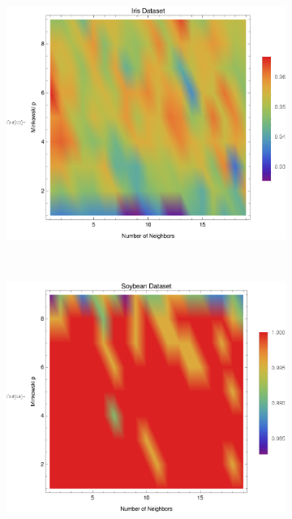 \documentclass{article}
\begin{document}
\begin{figure}[h!]
\begin{subfigure}[b]{0.32\textwidth}
					\caption{}
					\label{kp_glass}					
				\end{subfigure} \	
				\begin{subfigure}[b]{0.32\textwidth}
					\centering
					\includegraphics[width=\textwidth]{figs/kNN/iris_plot_kp}	
					\caption{}
					\label{kp_iris}				
				\end{subfigure} \	
				\begin{subfigure}[b]{0.32\textwidth}
					\centering
					\includegraphics[width=\textwidth]{figs/kNN/soybean_plot_kp}	
					\caption{}
					\label{kp_soybean}				

\end{subfigure}
\end{figure}
\end{document}

